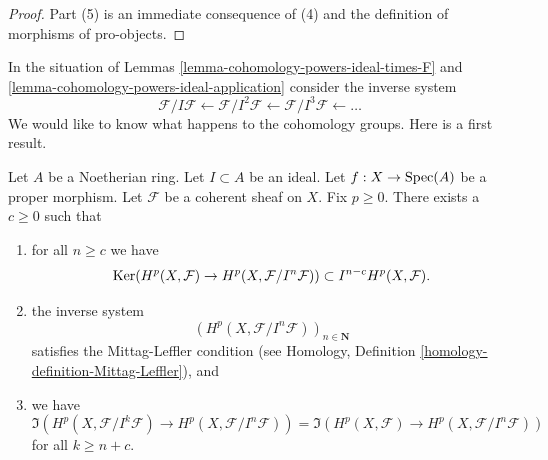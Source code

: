 \begin{proof}
\medskip\noindent
Part (5) is an immediate consequence of (4) and the definition of
morphisms of pro-objects.
\end{proof}

\noindent
In the situation of Lemmas \ref{lemma-cohomology-powers-ideal-times-F} and
\ref{lemma-cohomology-powers-ideal-application} consider the inverse
system
$$
\mathcal{F}/I\mathcal{F} \leftarrow
\mathcal{F}/I^2\mathcal{F} \leftarrow
\mathcal{F}/I^3\mathcal{F} \leftarrow \ldots
$$
We would like to know what happens to the cohomology groups.
Here is a first result.

\begin{lemma}
\label{lemma-ML-cohomology-powers-ideal}
Let $A$ be a Noetherian ring.
Let $I \subset A$ be an ideal.
Let $f : X \to \mathop{\mathrm{Spec}}(A)$ be a proper morphism.
Let $\mathcal{F}$ be a coherent sheaf on $X$.
Fix $p \geq 0$. There exists a $c \geq 0$ such that
\begin{enumerate}
\item for all $n \geq c$ we have
$$
\mathop{\mathrm{Ker}}(H^p(X, \mathcal{F}) \to H^p(X, \mathcal{F}/I^n\mathcal{F})) \subset
I^{n - c}H^p(X, \mathcal{F}).
$$
\item the inverse system
$$
\left(H^p(X, \mathcal{F}/I^n\mathcal{F})\right)_{n \in \mathbf{N}}
$$
satisfies the Mittag-Leffler condition (see
Homology, Definition \ref{homology-definition-Mittag-Leffler}), and
\item we have
$$
\Im(H^p(X, \mathcal{F}/I^k\mathcal{F})
\to H^p(X, \mathcal{F}/I^n\mathcal{F}))
=
\Im(H^p(X, \mathcal{F})
\to H^p(X, \mathcal{F}/I^n\mathcal{F}))
$$
for all $k \geq n + c$.
\end{enumerate}
\end{lemma}

